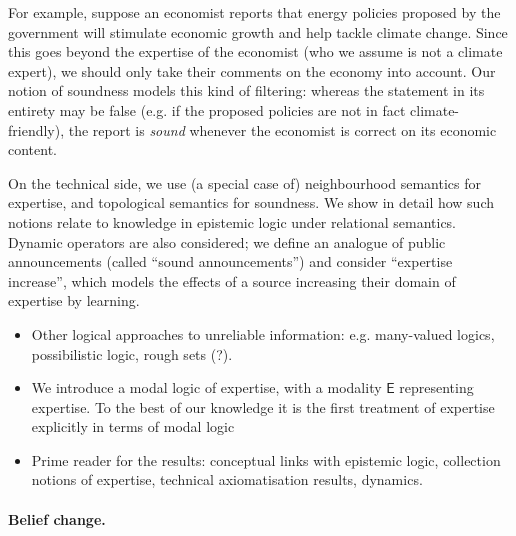 {For example, suppose an economist reports that energy policies proposed by the
government will stimulate economic growth and help tackle climate change. Since
this goes beyond the expertise of the economist (who we assume is not a climate
expert), we should only take their comments on the economy into account. Our
notion of soundness models this kind of filtering: whereas the statement in its
entirety may be false (e.g. if the proposed policies are not in fact
climate-friendly), the report is \emph{sound} whenever the economist is correct
on its economic content.

On the technical side, we use (a special case of) neighbourhood semantics for
expertise, and topological semantics for soundness. We show in detail how such
notions relate to knowledge in epistemic logic under relational semantics.
Dynamic operators are also considered; we define an analogue of public
announcements (called ``sound announcements'') and consider ``expertise
increase'', which models the effects of a source increasing their domain of
expertise by learning.

\begin{notes}
    \begin{itemize}
        \item Other logical approaches to unreliable information: e.g.
              many-valued logics, possibilistic logic, rough sets (?).
        \item We introduce a modal logic of expertise, with a modality
              $\mathsf{E}$ representing expertise. To the best of our knowledge
              it is the first treatment of expertise explicitly in terms of
              modal logic
        \item Prime reader for the results: conceptual links with epistemic
              logic, collection notions of expertise, technical axiomatisation
              results, dynamics.
    \end{itemize}
\end{notes}


}

\paragraph{Belief change.}

